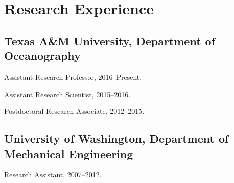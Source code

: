 \documentclass[10pt,letterpaper]{article}
\renewenvironment{itemize}{
  \begin{list}{}{
    \setlength{\leftmargin}{1.5em}
    \setlength{\itemsep}{0.25em}
    \setlength{\parskip}{0pt}
    \setlength{\parsep}{0.25em}
  }
}{
  \end{list}
}
\begin{document}
\section*{Research Experience}

\subsection*{Texas A\&M University, Department of Oceanography}

\begin{itemize}

\item Assistant Research Professor, 2016--Present.
\item Assistant Research Scientist, 2015--2016.
\item Postdoctoral Research Associate, 2012--2015.

\end{itemize}

\subsection*{University of Washington, Department of Mechanical Engineering}

\begin{itemize}

\item Research Assistant, 2007--2012.


\end{itemize}




\end{document}
